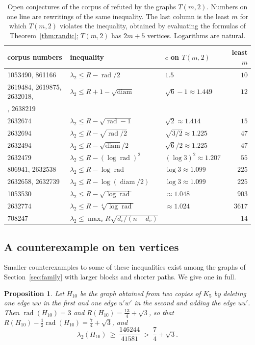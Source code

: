 \documentclass[11pt]{amsart}
\newtheorem{proposition}[theorem]{Proposition}
\theoremstyle{definition}
\theoremstyle{remark}
\newcommand{\rad}{\operatorname{rad}}
\newcommand{\diam}{\operatorname{diam}}
\begin{document}
\begin{table}[ht]
\centering
\footnotesize
\begin{tabular}{@{}lllr@{}}
\toprule
corpus numbers & inequality & $c$ on $T(m,2)$ & least $m$\\
\midrule
1053490, 861166 & $\lambda_2\le R-\rad/2$ & $1.5$ & $10$\\
2619484, 2619875, 2632018, & $\lambda_2\le R+1-\sqrt{\diam}$ & $\sqrt6-1\approx1.449$ & $12$\\
\quad 2632484, 2638219 & & &\\
2632674 & $\lambda_2\le R-\sqrt{\rad-1}$ & $\sqrt2\approx1.414$ & $15$\\
2632694 & $\lambda_2\le R-\sqrt{\rad/2}$ & $\sqrt{3/2}\approx1.225$ & $47$\\
2632494 & $\lambda_2\le R-\sqrt{\diam}/2$ & $\sqrt6/2\approx1.225$ & $47$\\
2632479 & $\lambda_2\le R-(\log\rad)^2$ & $(\log3)^2\approx1.207$ & $55$\\
806941, 2632538 & $\lambda_2\le R-\log\rad$ & $\log3\approx1.099$ & $225$\\
2632658, 2632739 & $\lambda_2\le R-\log(\diam/2)$ & $\log3\approx1.099$ & $225$\\
1053530 & $\lambda_2\le R-\sqrt{\log\rad}$ & $\approx1.048$ & $903$\\
2632774 & $\lambda_2\le R-\sqrt[4]{\log\rad}$ & $\approx1.024$ & $3617$\\
\midrule
708247 & $\lambda_2\le\max_v R\sqrt{d_v/(n-d_v)}$ & & $14$\\
\bottomrule
\end{tabular}
\smallskip
\caption{Open conjectures of the corpus of \cite{Cazenave,DuhamelCazenave} refuted by the
graphs $T(m,2)$. Numbers on one line are rewritings of the same inequality. The last column is
the least $m$ for which $T(m,2)$ violates the inequality, obtained by evaluating the formulas of
Theorem~\ref{thm:randic}; $T(m,2)$ has $2m+5$ vertices. Logarithms are natural.}\label{tab:rows}
\end{table}

\subsection{A counterexample on ten vertices}
Smaller counterexamples to some of these inequalities exist among the graphs of
Section~\ref{sec:family} with larger blocks and shorter paths. We give one in full.

\begin{proposition}\label{prop:H10}
Let $H_{10}$ be the graph obtained from two copies of $K_5$ by deleting one edge $uw$ in the
first and one edge $u'w'$ in the second and adding the edge $uu'$. Then $\rad(H_{10})=3$ and
$R(H_{10})=\frac{13}{4}+\sqrt3$, so that $R(H_{10})-\frac12\rad(H_{10})=\frac74+\sqrt3$, and
\[
\lambda_2(H_{10})\ \ge\ \frac{146244}{41581}\ >\ \frac74+\sqrt3 .
\]
\end{proposition}
\end{document}
